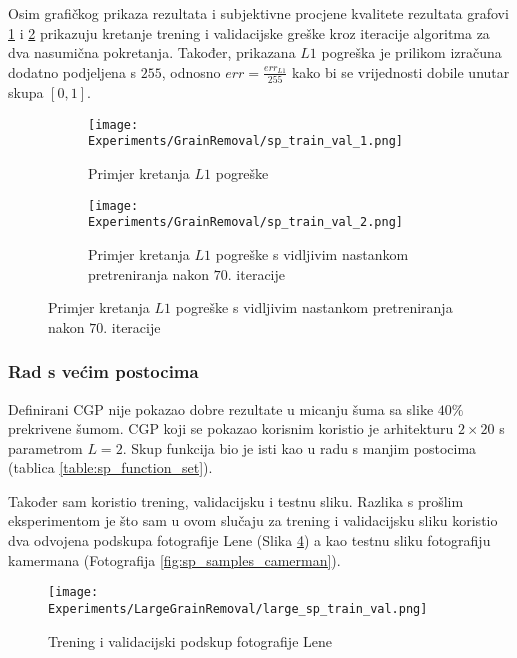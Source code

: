 Osim grafičkog prikaza rezultata i subjektivne procjene kvalitete rezultata grafovi \ref{fig:sp_train_val_graph_1} i \ref{fig:sp_train_val_graph_2} prikazuju kretanje trening i validacijske greške kroz iteracije algoritma za dva nasumična pokretanja.
Također, prikazana $L1$ pogreška je prilikom izračuna dodatno podjeljena s $255$, odnosno $err = \frac{err_{L1}}{255}$ kako bi se vrijednosti dobile unutar skupa $[0, 1]$.

\begin{figure}
	\centering
	\caption{Grafovi kretanja $L1$ pogreške kroz iteracije algoritma}
	\begin{subfigure}[t]{0.48\textwidth}
		\texttt{[image: Experiments/GrainRemoval/sp\_train\_val\_1.png]}
		\caption{Primjer kretanja $L1$ pogreške}
		\label{fig:sp_train_val_graph_1}
	\end{subfigure}
	\begin{subfigure}[t]{0.48\textwidth}
		\texttt{[image: Experiments/GrainRemoval/sp\_train\_val\_2.png]}
		\caption{Primjer kretanja $L1$ pogreške s vidljivim nastankom pretreniranja nakon $70.$ iteracije}
		\label{fig:sp_train_val_graph_2}
	\end{subfigure}
	\label{fig:sp_train_val_graph}
\end{figure}

\subsubsection{Rad s većim postocima}
Definirani CGP nije pokazao dobre rezultate u micanju šuma sa slike $40\%$ prekrivene šumom.
CGP koji se pokazao korisnim koristio je arhitekturu $2 \times 20$ s parametrom $L = 2$.
Skup funkcija bio je isti kao u radu s manjim postocima (tablica \ref{table:sp_function_set}).

Također sam koristio trening, validacijsku i testnu sliku.
Razlika s prošlim eksperimentom je što sam u ovom slučaju za trening i validacijsku sliku koristio dva odvojena podskupa fotografije Lene (Slika \ref{fig:large_sp_train_val_illustration}) a kao testnu sliku fotografiju kamermana (Fotografija \ref{fig:sp_samples_camerman}).

\begin{figure}
	\centering
	\texttt{[image: Experiments/LargeGrainRemoval/large\_sp\_train\_val.png]}
	\caption{Trening i validacijski podskup fotografije Lene}
	\label{fig:large_sp_train_val_illustration}
\end{figure}

